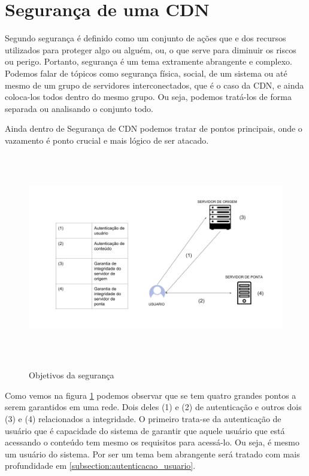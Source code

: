 \section{Seguran\c{c}a de uma CDN} \label{sec:seguranca}
Segundo \cite{ferreira2004novo} seguran\c{c}a \'e definido como um conjunto de a\c{c}\~oes que e dos recursos utilizados para proteger algo ou algu\'em, ou, o que serve para diminuir os riscos ou perigo. Portanto, seguran\c{c}a \'e um tema extramente abrangente e complexo. Podemos falar de t\'opicos como seguran\c{c}a f\'isica, social, de um sistema ou at\'e mesmo de um grupo de servidores interconectados, que \'e o caso da CDN, e ainda coloca-los todos dentro do mesmo grupo. Ou seja, podemos trat\'a-los de forma separada ou analisando o conjunto todo.
 
Ainda dentro de Seguran\c{c}a de CDN podemos tratar de pontos principais, onde o vazamento \'e ponto crucial e mais l\'ogico de ser atacado. 
\begin{figure}[H]
\caption{Objetivos da seguran\c{c}a}
\includegraphics[height=9cm]{Figuras/seguranca_intro.png} 
\label{figura:seguranca_intro}
\end{figure}

Como vemos na figura \ref{figura:seguranca_intro} podemos observar que se tem quatro grandes pontos a serem garantidos em uma rede. Dois deles (1) e (2) de autentica\c{c}\~ao e outros dois (3) e (4) relacionados a integridade. O primeiro trata-se da autentica\c{c}\~ao de usu\'ario que \'e capacidade do sistema de garantir que aquele usu\'ario que est\'a acessando o conte\'udo tem mesmo os requisitos para acess\'a-lo. Ou seja, \'e mesmo um usu\'ario do sistema. Por ser um tema bem abrangente ser\'a tratado com mais profundidade em \ref{subsection:autenticacao_usuario}.

